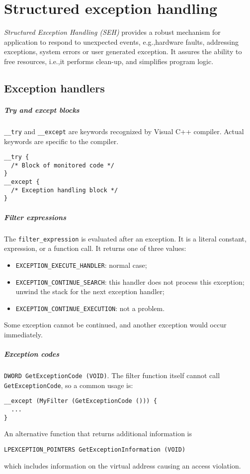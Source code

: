 \chapter{Structured exception handling}
\emph{Structured Exception Handling (SEH)} provides a robust mechanism for application to respond to unexpected events, e.g.,\@ hardware faults, addressing exceptions, system errors or user generated exception. It assures the ability to free resources, i.e.,\@ it performs clean-up, and simplifies program logic.

\section{Exception handlers}
\paragraph{Try and except blocks}
\texttt{\_\_try} and \texttt{\_\_except} are keywords recognized by Visual C++ compiler. Actual keywords are specific to the compiler.

\begin{verbatim}
__try {
  /* Block of monitored code */
}
__except {
  /* Exception handling block */
}
\end{verbatim}

\paragraph{Filter expressions}
The \texttt{filter\_expression} is evaluated after an exception. It is a literal constant, expression, or a function call. It returns one of three values:
\begin{itemize}
\item \texttt{EXCEPTION\_EXECUTE\_HANDLER}: normal case;
\item \texttt{EXCEPTION\_CONTINUE\_SEARCH}: this handler does not process this exception; unwind the stack for the next exception handler;
\item \texttt{EXCEPTION\_CONTINUE\_EXECUTION}: not a problem.
\end{itemize}
Some exception cannot be continued, and another exception would occur immediately.

\paragraph{Exception codes} \texttt{DWORD GetExceptionCode (VOID)}. The filter function itself cannot call \texttt{GetExceptionCode}, so a common usage is:
\begin{verbatim}
__except (MyFilter (GetExceptionCode ())) {
  ...
}
\end{verbatim}
An alternative function that returns additional information is
\begin{verbatim}
LPEXCEPTION_POINTERS GetExceptionInformation (VOID)
\end{verbatim}
which includes information on the virtual address causing an access violation.

